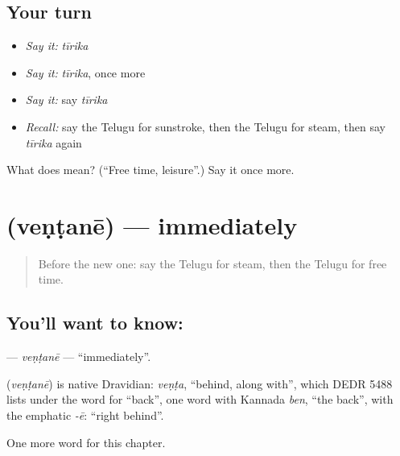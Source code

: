 \subsection*{Your turn}
\begin{itemize}
\raggedright
  \item \emph{Say it:} \emph{tīrika}
  \item \emph{Say it:} \emph{tīrika}, once more
  \item \emph{Say it:} say \emph{tīrika}
  \item \emph{Recall:} say the Telugu for sunstroke, then the Telugu for steam, then say \emph{tīrika} again
\end{itemize}

\begin{tcolorbox}[breakable,colback=teal!4,colframe=teal!35!black,title={Before you move on}]
What does  mean? (\textquotedblleft{}Free time, leisure\textquotedblright{}.) Say it once more.
\end{tcolorbox}
\section[\texorpdfstring{\te{వెంటనే} (veṇṭanē)}{వెంటనే (veṇṭanē)}]{ (veṇṭanē) — immediately}

\label{lesson:TE-C212-ventane}



\begin{quote}
Before the new one: say the Telugu for steam, then the Telugu for free time.
\end{quote}

\subsection*{You'll want to know: }
\textbf{} — \emph{veṇṭanē} — \textquotedblleft{}immediately\textquotedblright{}.

\begin{cousinweb}
\textbf{} (\emph{veṇṭanē}) is native Dravidian: \emph{veṇṭa}, \textquotedblleft{}behind, along with\textquotedblright{}, which DEDR 5488 lists under the word for \textquotedblleft{}back\textquotedblright{}, one word with Kannada \emph{ben}, \textquotedblleft{}the back\textquotedblright{}, with the emphatic \emph{-ē}: \textquotedblleft{}right behind\textquotedblright{}.
\end{cousinweb}

\begin{grammarlens}[title={What you've built}]
One more word for this chapter.
\end{grammarlens}

